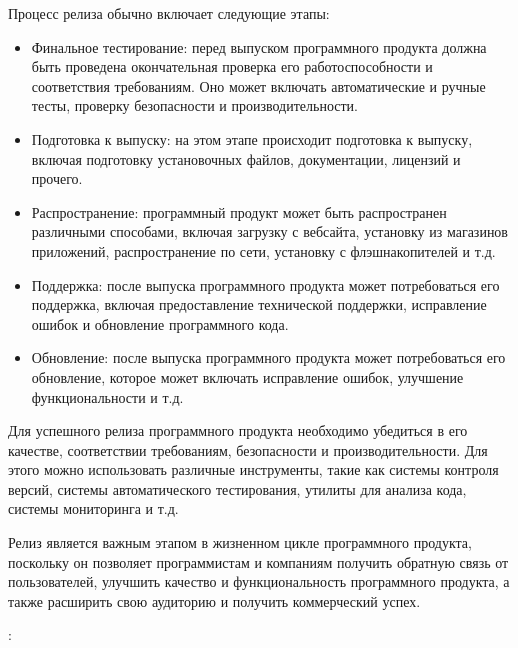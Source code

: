 \documentclass[letterpaper,10pt,russian]{sphinxmanual}
\begin{document}
\sphinxAtStartPar
Процесс релиза обычно включает следующие этапы:
\begin{itemize}
\item {} 
\sphinxAtStartPar
Финальное тестирование: перед выпуском программного продукта должна быть проведена окончательная проверка его работоспособности и соответствия требованиям. Оно может включать автоматические и ручные тесты, проверку безопасности и производительности.

\item {} 
\sphinxAtStartPar
Подготовка к выпуску: на этом этапе происходит подготовка к выпуску, включая подготовку установочных файлов, документации, лицензий и прочего.

\item {} 
\sphinxAtStartPar
Распространение: программный продукт может быть распространен различными способами, включая загрузку с веб\sphinxhyphen{}сайта, установку из магазинов приложений, распространение по сети, установку с флэш\sphinxhyphen{}накопителей и т.д.

\item {} 
\sphinxAtStartPar
Поддержка: после выпуска программного продукта может потребоваться его поддержка, включая предоставление технической поддержки, исправление ошибок и обновление программного кода.

\item {} 
\sphinxAtStartPar
Обновление: после выпуска программного продукта может потребоваться его обновление, которое может включать исправление ошибок, улучшение функциональности и т.д.

\end{itemize}

\sphinxAtStartPar
Для успешного релиза программного продукта необходимо убедиться в его качестве, соответствии требованиям, безопасности и производительности. Для этого можно использовать различные инструменты, такие как системы контроля версий, системы автоматического тестирования, утилиты для анализа кода, системы мониторинга и т.д.

\sphinxAtStartPar
Релиз является важным этапом в жизненном цикле программного продукта, поскольку он позволяет программистам и компаниям получить обратную связь от пользователей, улучшить качество и функциональность программного продукта, а также расширить свою аудиторию и получить коммерческий успех.

\sphinxAtStartPar
{}: 
\end{document}
